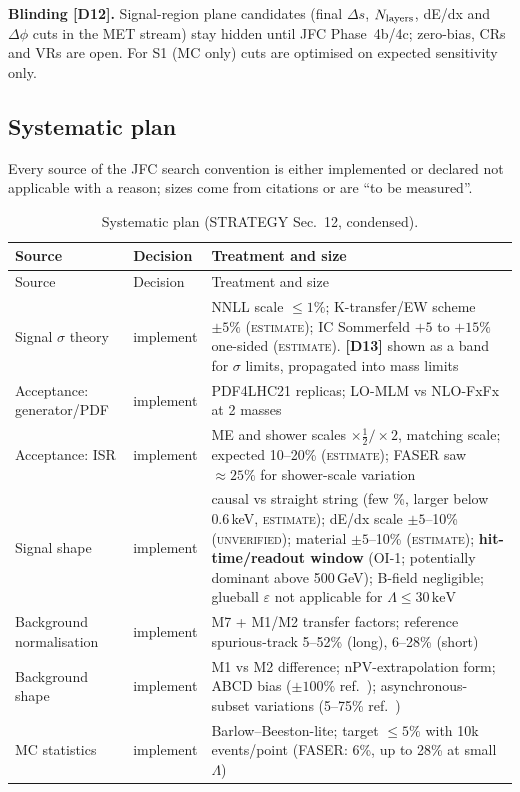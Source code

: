 \documentclass[11pt,a4paper]{article}
\newcommand{\EST}{\textsc{estimate}}
\newcommand{\UNV}{\textsc{unverified}}
\newcommand{\keV}{\,\mathrm{keV}}
\newcommand{\lab}[1]{\textbf{[#1]}}
\begin{document}
\textbf{Blinding [D12].} Signal-region plane candidates (final $\Delta s$, $N_{\rm layers}$, dE/dx and $\Delta\phi$ cuts in the MET stream) stay hidden until JFC Phase~4b/4c; zero-bias, CRs and VRs are open. For S1 (MC only) cuts are optimised on expected sensitivity only.

\subsection{Systematic plan}
Every source of the JFC search convention is either implemented or declared not applicable with a reason; sizes come from citations or are ``to be measured''.
{\small
\begin{longtable}{@{}L{3.53cm}L{2.07cm}L{10.79cm}@{}}
\caption{Systematic plan (STRATEGY Sec.~12, condensed).}\label{tab:syst}\\
\toprule Source & Decision & Treatment and size\\\midrule\endfirsthead
\toprule Source & Decision & Treatment and size\\\midrule\endhead
\bottomrule\endfoot
Signal $\sigma$ theory & implement & NNLL scale $\leq1\%$; K-transfer/EW scheme $\pm5\%$ (\EST); IC Sommerfeld $+5$ to $+15\%$ one-sided (\EST). \lab{D13} shown as a band for $\sigma$ limits, propagated into mass limits\\
Acceptance: generator/PDF & implement & PDF4LHC21 replicas; LO-MLM vs NLO-FxFx at 2 masses\\
Acceptance: ISR & implement & ME and shower scales $\times\frac12/\times2$, matching scale; expected 10--20\% (\EST); FASER saw $\approx25\%$ for shower-scale variation\\
Signal shape & implement & causal vs straight string (few \%, larger below 0.6\,keV, \EST); dE/dx scale $\pm5$--10\% (\UNV); material $\pm5$--10\% (\EST); \textbf{hit-time/readout window} (OI-1; potentially dominant above 500\,GeV); B-field negligible; glueball $\varepsilon$ not applicable for $\Lambda\leq30\keV$\\
Background normalisation & implement & M7 + M1/M2 transfer factors; reference spurious-track 5--52\% (long), 6--28\% (short) \cite{DT}\\
Background shape & implement & M1 vs M2 difference; nPV-extrapolation form; ABCD bias ($\pm100\%$ ref.\ \cite{HSCP}); asynchronous-subset variations (5--75\% ref.\ \cite{L1DS})\\
MC statistics & implement & Barlow--Beeston-lite; target $\leq5\%$ with 10k events/point (FASER: 6\%, up to 28\% at small $\Lambda$)\\

\end{longtable}}
\end{document}
